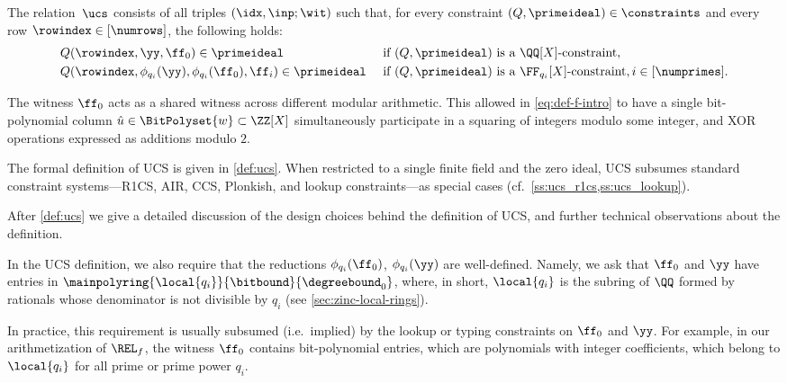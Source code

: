 The relation~$\ucs$ consists of all triples $(\idx, \inp;\wit)$ such that, for every constraint $(Q,\primeideal)\in\constraints$ and every row $\rowindex\in[\numrows]$, the following holds: 
%
\begin{align*}
 &Q(\rowindex,\yy,\ff_0)\in\primeideal &&\text{ if } (Q,\primeideal) \text{ is a } \QQ[X]\text{-constraint},\\
  &Q(\rowindex,\phi_{q_i}(\yy),\phi_{q_i}(\ff_0),\ff_i)\in\primeideal &&\text{ if }  (Q,\primeideal) \text{ is a } \FF_{q_i}[X]\text{-constraint}, i\in [\numprimes].
\end{align*}
%
\begin{remark}
The witness $\ff_0$ acts as a shared witness across different modular arithmetic.  This allowed in \cref{eq:def-f-intro} to have a single bit-polynomial column $\hat{u}\in\BitPolyset{w}\subset\ZZ[X]$ simultaneously participate in a squaring of integers modulo some integer, and XOR operations expressed as additions modulo $2$.
\end{remark}

The formal definition of UCS is given in \cref{def:ucs}. When restricted to a single finite field and the zero ideal, UCS subsumes standard constraint systems---R1CS, AIR, CCS, Plonkish, and lookup constraints---as special cases (cf.\ \cref{ss:ucs_r1cs,ss:ucs_lookup}).

After \cref{def:ucs} we give a detailed discussion of the design choices behind the definition of UCS, and further technical observations about the definition. 


\begin{remark}\label{rem:well-defined-projections} In the UCS definition, we also require that the reductions $\phi_{q_i}(\ff_0)$, $\phi_{q_i}(\yy)$ are well-defined. Namely, we ask that $\ff_0$ and $\yy$ have entries in $\mainpolyring{\local{q_i}}{\bitbound}{\degreebound_0}$, where, in short, $\local{q_i}$ is the subring of $\QQ$ formed by rationals whose denominator is not divisible by $q_i$  (see \cref{sec:zinc-local-rings}).
  
  
  In practice, this requirement is usually subsumed (i.e.\ implied) by the lookup or typing constraints on $\ff_0$ and $\yy$. For example, in our arithmetization of $\REL_f$, the witness $\ff_0$ contains bit-polynomial entries, which are polynomials with integer coefficients, which belong to $\local{q_i}$ for all prime or prime power $q_i$. 
\end{remark}


